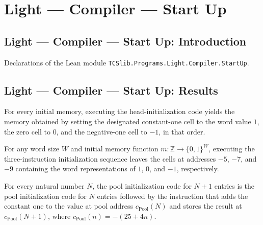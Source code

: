 \section{Light --- Compiler --- Start Up}
\subsection*{Light --- Compiler --- Start Up: Introduction}

Declarations of the Lean module \texttt{TCSlib.Programs.Light.Compiler.StartUp}.

\subsection*{Light --- Compiler --- Start Up: Results}

\begin{theorem}
\label{Light.Compiler.effects_headStraight}
\leanok
{}
For every initial memory, executing the head-initialization code yields the memory
obtained by setting the designated constant-one cell to the word value $1$, the zero
cell to $0$, and the negative-one cell to $-1$, in that order.
\end{theorem}

\begin{theorem}
\label{Light.Compiler.effects_headStraight_consts}
\leanok
{}
For any word size $W$ and initial memory function $m : \mathbb{Z} \to \{0,1\}^W$,
executing the three-instruction initialization sequence leaves the cells at addresses
$-5$, $-7$, and $-9$ containing the word representations of $1$, $0$, and $-1$,
respectively.
\end{theorem}

\begin{theorem}
\label{Light.Compiler.poolCode_succ}
\leanok
{}
For every natural number $N$, the pool initialization code for $N+1$ entries is the pool
initialization code for $N$ entries followed by the instruction that adds the constant
one to the value at pool address $c_{\mathrm{Pool}}(N)$ and stores the result at
$c_{\mathrm{Pool}}(N+1)$, where $c_{\mathrm{Pool}}(n)=-(25+4n)$.
\end{theorem}

